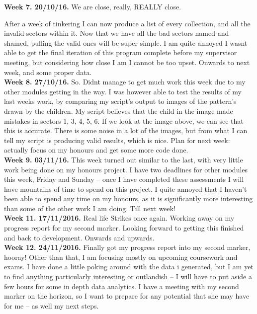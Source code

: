 \begin{appendices}
		\textbf{Week 7. 20/10/16.}
		We are close, really, REALLY close.
		
		After a week of tinkering I can now produce a list of  every collection, and all the invalid sectors within it.
		Now that we have all the bad sectors named and shamed, pulling the valid ones will be super simple.
		I am quite annoyed I wasnt able to get the final iteration of this program complete before my supervisor meeting, but considering how close I am I cannot be too upset.
		Onwards to next week, and some proper data.
		\\
		
		\textbf{Week 8. 27/10/16.}
		So. Didnt manage to get much work this week due to my other modules getting in the way.
		I was however able to test the results of my last weeks work, by comparing my script’s output to images of the pattern’s drawn by the children.
		My script believes that the child in the image made mistakes in sectors {1, 3, 4, 5, 6}. If we look at the image above, we can see that this is accurate.
		There is some noise in a lot of the images, but from what I can tell my script is producing valid results, which is nice.
		Plan for next week: actually focus on my honours and get some more code done.\\
		
		\textbf{Week 9. 03/11/16.}
		This week turned out similar to the last, with very little work being done on my honours project.
		I have two deadlines for other modules this week, Friday and Sunday – once I have completed these assessments I will have mountains of time to spend on this project.
		I quite annoyed that I haven’t been able to spend any time on my honours, as it is significantly more interesting than some of the other work I am doing.
		Till next week!\\
		
		\textbf{Week 11. 17/11/2016.}
		Real life Strikes once again.
		Working away on my progress report for my second marker.
		Looking forward to getting this finished and back to development.
		Onwards and upwards.\\
		
		
		\textbf{Week 12. 24/11/2016.}
		Finally got my progress report into my second marker, hooray!
		Other than that, I am focusing mostly on upcoming coursework and exams.
		I have done a little poking around with the data i generated, but I am yet to find anything particularly interesting or outlandish – I will have to put aside a few hours for some in depth data analytics.
		I have a meeting with my second marker on the horizon, so I want to prepare for any potential that she may have for me – as well my next steps.\\
		

\end{appendices}
